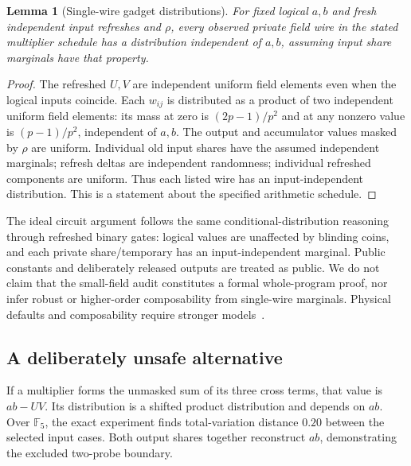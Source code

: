 \documentclass[11pt]{article}
\newtheorem{lemma}{Lemma}
\begin{document}
\begin{lemma}[Single-wire gadget distributions]
For fixed logical $a,b$ and fresh independent input refreshes and $\rho$,
every observed private field wire in the stated multiplier schedule has a
distribution independent of $a,b$, assuming input share marginals have that
property.
\end{lemma}
\begin{proof}
The refreshed $U,V$ are independent uniform field elements even when the
logical inputs coincide. Each $w_{ij}$ is distributed as a product of two
independent uniform field elements: its mass at zero is $(2p-1)/p^2$ and
at any nonzero value is $(p-1)/p^2$, independent of $a,b$.
The output and accumulator values masked by $\rho$ are uniform.
Individual old input shares have the assumed independent marginals;
refresh deltas are independent randomness; individual refreshed components
are uniform. Thus each listed wire has an input-independent distribution.
This is a statement about the specified arithmetic schedule.
\end{proof}

The ideal circuit argument follows the same conditional-distribution
reasoning through refreshed binary gates: logical values are unaffected
by blinding coins, and each private share/temporary has an input-independent
marginal. Public constants and deliberately released outputs are treated
as public. We do not claim that the small-field audit constitutes a formal
whole-program proof, nor infer robust or higher-order composability from
single-wire marginals. Physical defaults and composability require stronger
models~\cite{robust}.

\subsection{A deliberately unsafe alternative}
If a multiplier forms the unmasked sum of its three cross terms, that value
is $ab-UV$. Its distribution is a shifted product distribution and depends
on $ab$. Over $\mathbb F_5$, the exact experiment finds total-variation
distance $0.20$ between the selected input cases. Both output shares
together reconstruct $ab$, demonstrating the excluded two-probe boundary.
\end{document}
